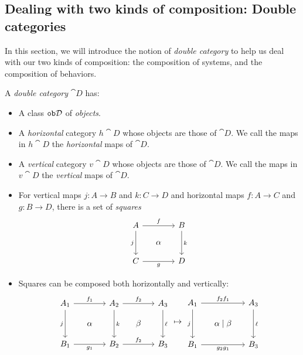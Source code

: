 \documentclass[DynamicalBook]{subfiles}
\begin{document}
\subsection{Dealing with two kinds of composition: Double categories}

In this section, we will introduce the notion of \emph{double category} to help
us deal with our two kinds of composition: the composition of systems, and the
composition of behaviors.

\begin{definition}\label{def.double_category}
  A \emph{double category} $\cat{D}$ has:
  \begin{itemize}
    \item A class $\mathtt{ob}\mathcal{D}$ of \emph{objects}.
    \item A \emph{horizontal} category $h \cat{D}$ whose objects are those of
      $\cat{D}$. We call the maps in $h\cat{D}$ the \emph{horizontal} maps of $\cat{D}$.
    \item A \emph{vertical} category $v \cat{D}$ whose objects are those of
      $\cat{D}$. We call the maps in $v\cat{D}$ the \emph{vertical} maps of $\cat{D}$.
    \item For vertical maps $j : A \to B$ and $k : C \to D$ and horizontal maps
      $f : A \to C$ and $g : B \to D$, there is a set of
      \emph{squares}
      \[
        \begin{tikzcd}[sep=small]
          A \ar[dd, "j"'] \ar[rr, "f"] & & B \ar[dd, "k"] \\
           & \alpha & \\
          C \ar[rr, "g"'] & & D
        \end{tikzcd}
      \]
    \item Squares can be composed both horizontally and vertically:
        \[
        \begin{tikzcd}[sep=small]
          A_1 \ar[dd, "j"'] \ar[rr, "f_1"] & & A_2 \ar[dd, "k"]  \ar[rr, "f_2"]&
          & A_3 \ar[dd, "\ell"]\\
           & \alpha &  & \beta &\\
          B_1 \ar[rr, "g_1"'] & & B_2 \ar[rr, "f_2"] & & B_3
        \end{tikzcd} \mapsto
        \begin{tikzcd}[sep=small]
          A_1 \ar[dd, "j"'] \ar[rr, "f_2 f_1"] & & A_3 \ar[dd, "\ell"] \\
           & \alpha \mid \beta & \\
          B_1 \ar[rr, "g_2 g_1"'] & & B_3

\end{tikzcd}\]
\end{itemize}
\end{definition}
\end{document}
